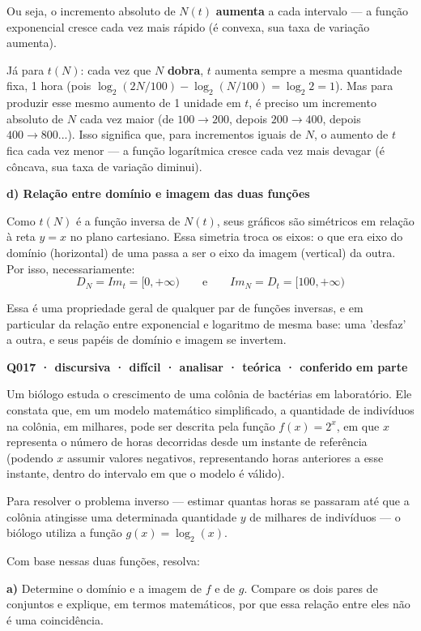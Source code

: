 \documentclass[11pt,a4paper]{article}
\begin{document}
Ou seja, o incremento absoluto de $N(t)$ \textbf{aumenta} a cada intervalo — a função exponencial cresce cada vez mais rápido (é convexa, sua taxa de variação aumenta).

Já para $t(N)$: cada vez que $N$ \textbf{dobra}, $t$ aumenta sempre a mesma quantidade fixa, 1 hora (pois $\log_2(2N/100) - \log_2(N/100) = \log_2 2 = 1$). Mas para produzir esse mesmo aumento de 1 unidade em $t$, é preciso um incremento absoluto de $N$ cada vez maior (de $100\to200$, depois $200\to400$, depois $400\to800$...). Isso significa que, para incrementos iguais de $N$, o aumento de $t$ fica cada vez menor — a função logarítmica cresce cada vez mais devagar (é côncava, sua taxa de variação diminui).

\textbf{d) Relação entre domínio e imagem das duas funções}

Como $t(N)$ é a função inversa de $N(t)$, seus gráficos são simétricos em relação à reta $y=x$ no plano cartesiano. Essa simetria troca os eixos: o que era eixo do domínio (horizontal) de uma passa a ser o eixo da imagem (vertical) da outra. Por isso, necessariamente:
$$D_{N} = Im_{t} = [0,+\infty) \qquad \text{e} \qquad Im_{N} = D_{t} = [100,+\infty)$$

Essa é uma propriedade geral de qualquer par de funções inversas, e em particular da relação entre exponencial e logaritmo de mesma base: uma 'desfaz' a outra, e seus papéis de domínio e imagem se invertem.

\bigskip\noindent\textbf{Q017 · discursiva · difícil · analisar · teórica · conferido em parte}\par\nopagebreak
Um biólogo estuda o crescimento de uma colônia de bactérias em laboratório. Ele constata que, em um modelo matemático simplificado, a quantidade de indivíduos na colônia, em milhares, pode ser descrita pela função $f(x) = 2^{x}$, em que $x$ representa o número de horas decorridas desde um instante de referência (podendo $x$ assumir valores negativos, representando horas anteriores a esse instante, dentro do intervalo em que o modelo é válido).

Para resolver o problema inverso — estimar quantas horas se passaram até que a colônia atingisse uma determinada quantidade $y$ de milhares de indivíduos — o biólogo utiliza a função $g(x) = \log_{2}(x)$.

Com base nessas duas funções, resolva:

\textbf{a)} Determine o domínio e a imagem de $f$ e de $g$. Compare os dois pares de conjuntos e explique, em termos matemáticos, por que essa relação entre eles não é uma coincidência.
\end{document}
